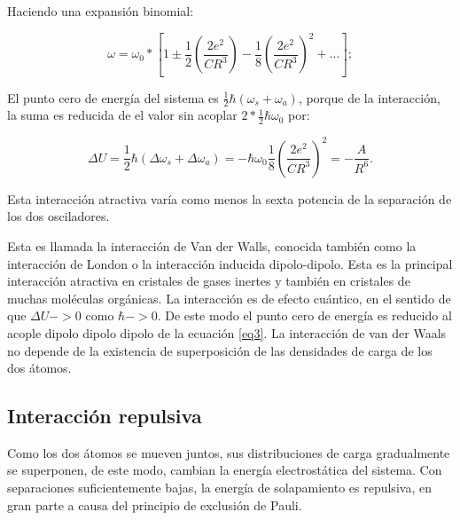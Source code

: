 \documentclass{article}
\begin{document}
Haciendo una expansión binomial:

\begin{equation}
    \omega =\omega_{0}* \left[ 1 \pm \frac{1}{2} \left(\frac{2e^{2}}{CR^{3}}\right) - \frac{1}{8} \left(\frac{2e^{2}}{CR^{3}}\right)^{2} + ... \right];
        \label{eq5}
\end{equation}

El punto cero de energía del sistema es $\frac{1}{2}\hbar (\omega_{s} + \omega_{a})$, porque de la interacción, la suma es reducida de el valor sin acoplar $2*\frac{1}{2}\hbar\omega_{0}$ por:

\begin{equation}
    \Delta U = \frac{1}{2}\hbar (\Delta \omega_{s} +\Delta \omega_{a}) = -\hbar \omega_{0}\frac{1}{8}\left(\frac{2e^{2}}{CR^{3}}\right)^{2} = -\frac{A}{R^{6}}.
        \label{eq6}
\end{equation}

Esta interacción atractiva varía como menos la sexta potencia de la separación de los dos osciladores.

Esta es llamada la interacción de Van der Walls, conocida también como la interacción de London o la interacción inducida dipolo-dipolo. Esta es la principal interacción atractiva en cristales de gases inertes y también en cristales de muchas moléculas orgánicas. La interacción es de efecto cuántico, en el sentido de que $\Delta U -> 0$ como $\hbar -> 0$. De este modo el punto cero de energía es reducido al acople dipolo dipolo dipolo de la ecuación \ref{eq3}. La interacción de van der Waals no depende de la existencia de superposición  de las densidades de carga de los dos átomos.

\subsection{Interacción repulsiva}

Como los dos átomos se mueven juntos, sus distribuciones de carga gradualmente se superponen, de este modo, cambian la energía electrostática del sistema. Con separaciones suficientemente bajas, la energía de solapamiento es repulsiva, en gran parte a causa del principio de exclusión de Pauli. 
\end{document}
